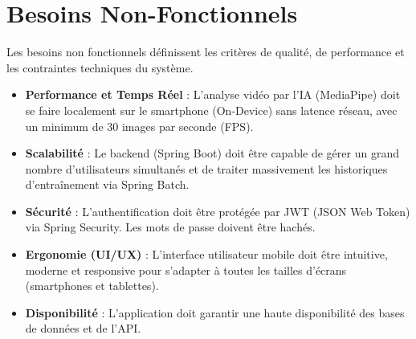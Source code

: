\section{Besoins Non-Fonctionnels}
Les besoins non fonctionnels définissent les critères de qualité, de performance et les contraintes techniques du système.

\begin{itemize}
    \item \textbf{Performance et Temps Réel} : L'analyse vidéo par l'IA (MediaPipe) doit se faire localement sur le smartphone (On-Device) sans latence réseau, avec un minimum de 30 images par seconde (FPS).
    \item \textbf{Scalabilité} : Le backend (Spring Boot) doit être capable de gérer un grand nombre d'utilisateurs simultanés et de traiter massivement les historiques d'entraînement via Spring Batch.
    \item \textbf{Sécurité} : L'authentification doit être protégée par JWT (JSON Web Token) via Spring Security. Les mots de passe doivent être hachés.
    \item \textbf{Ergonomie (UI/UX)} : L'interface utilisateur mobile doit être intuitive, moderne et responsive pour s'adapter à toutes les tailles d'écrans (smartphones et tablettes).
    \item \textbf{Disponibilité} : L'application doit garantir une haute disponibilité des bases de données et de l'API.
\end{itemize}
